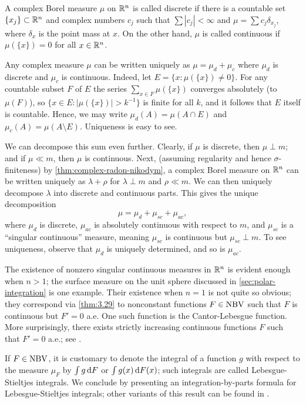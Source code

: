 \documentclass[12pt]{article} %
\begin{document}
\begin{definition}
    A complex Borel measure $\mu$ on $\mathbb{R}^n$ is called discrete if there is a countable set $\{x_j\} \subset \mathbb{R}^n$ and complex numbers $c_j$ such that $\sum |c_j| < \infty$ and $\mu = \sum c_j \delta_{x_j}$, where $\delta_x$ is the point mass at $x$. On the other hand, $\mu$ is called continuous if $\mu(\{x\}) = 0$ for all $x \in \mathbb{R}^n$. 
\end{definition}

\noindent Any complex measure $\mu$ can be written uniquely as $\mu = \mu_d + \mu_c$ where $\mu_d$ is discrete and $\mu_c$ is continuous. Indeed, let $E = \{x : \mu(\{x\}) \neq 0\}$. For any countable subset $F$ of $E$ the series $\sum_{x \in F} \mu(\{x\})$ converges absolutely (to $\mu(F)$), so $\{x \in E : |\mu(\{x\})| > k^{-1}\}$ is finite for all $k$, and it follows that $E$ itself is countable. Hence, we may write $\mu_d(A) = \mu(A \cap E)$ and $\mu_c(A) = \mu(A \setminus E)$. Uniqueness is easy to see.

We can decompose this sum even further. Clearly, if $\mu$ is discrete, then $\mu \perp m$; and if $\mu \ll m$, then $\mu$ is continuous. Next, (assuming regularity and hence $\sigma$-finiteness) by \cref{thm:complex-radon-nikodym}, a complex Borel measure on $\mathbb{R}^n$ can be written uniquely as $\lambda + \rho$ for $\lambda \perp m$ and $\rho \ll m$. We can then uniquely decompose $\lambda$ into discrete and continuous parts. This gives the unique decomposition \[\mu = \mu_d + \mu_{sc} + \mu_{ac},\] where $\mu_d$ is discrete, $\mu_{ac}$ is absolutely continuous with respect to $m$, and $\mu_{sc}$ is a ``singular continuous'' measure, meaning $\mu_{sc}$ is continuous but $\mu_{sc} \perp m$. To see uniqueness, observe that $\mu_d$ is uniquely determined, and so is $\mu_{ac}$.

The existence of nonzero singular continuous measures in $\mathbb{R}^n$ is evident enough when $n > 1$; the surface measure on the unit sphere discussed in \cref{sec:polar-integration} is one example. Their existence when $n = 1$ is not quite so obvious; they correspond via \cref{thm:3.29} to nonconstant functions $F \in \operatorname{NBV}$ such that $F$ is continuous but $F' = 0$ a.e. One such function is the Cantor-Lebesgue function. More surprisingly, there exists strictly increasing continuous functions $F$ such that $F' = 0$ a.e.; see \citet[Exercise~40]{folland1999real}.

If $F \in \operatorname{NBV}$, it is customary to denote the integral of a function $g$ with respect to the measure $\mu_F$ by $\int g \, \mathrm{d} F$ or $\int g(x)\, \mathrm{d} F(x)$; such integrals are called Lebesgue-Stieltjes integrals. We conclude by presenting an integration-by-parts formula for Lebesgue-Stieltjes integrals; other variants of this result can be found in \citet[Exercises~34, 35]{folland1999real}.
\end{document}
